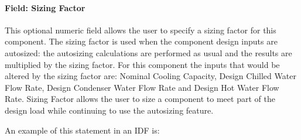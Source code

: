 \paragraph{Field: Sizing Factor}\label{field-sizing-factor-8}

This optional numeric field allows the user to specify a sizing factor for this component. The sizing factor is used when the component design inputs are autosized: the autosizing calculations are performed as usual and the results are multiplied by the sizing factor. For this component the inputs that would be altered by the sizing factor are: Nominal Cooling Capacity, Design Chilled Water Flow Rate, Design Condenser Water Flow Rate and Design Hot Water Flow Rate. Sizing Factor allows the user to size a component to meet part of the design load while continuing to use the autosizing feature.

An example of this statement in an IDF is:

